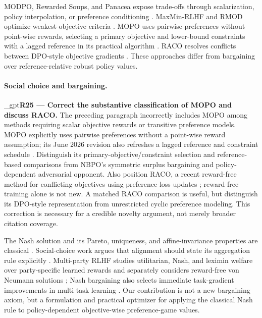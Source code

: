 \documentclass{article}
\newif\ifshowreviews
\newcommand{\reviewresponse}[1]{%
  \ifshowreviews
  \par\begingroup\color{blue!65!black}\hypersetup{allcolors=blue!65!black}\emergencystretch=2em%
  \noindent\textbf{Response:} #1\par\endgroup
  \fi}
\theoremstyle{remark}
\theoremstyle{plain}
\begin{document}
MODPO, Rewarded Soups, and Panacea expose trade-offs through scalarization, policy interpolation, or preference conditioning \citep{zhou2024beyond,rame2023rewarded,zhong2024panacea}. MaxMin-RLHF and RMOD optimize weakest-objective criteria \citep{chakraborty2024maxmin,son2026rmod}. MOPO uses pairwise preferences without point-wise rewards, selecting a primary objective and lower-bound constraints with a lagged reference in its practical algorithm \citep{agnihotri2026mopo}. RACO resolves conflicts between DPO-style objective gradients \citep{chen2026raco}. These approaches differ from bargaining over reference-relative robust policy values.

\paragraph{Social choice and bargaining.}

\kekim_gpt{\textbf{R25 --- Correct the substantive classification of MOPO and discuss RACO.} The preceding paragraph incorrectly includes MOPO among methods requiring scalar objective rewards or transitive preference models. MOPO explicitly uses pairwise preferences without a point-wise reward assumption; its June 2026 revision also refreshes a lagged reference and constraint schedule \citep{agnihotri2026mopo}. Distinguish its primary-objective/constraint selection and reference-based comparisons from NBPO's symmetric surplus bargaining and policy-dependent adversarial opponent. Also position RACO, a recent reward-free method for conflicting objectives using preference-loss updates \citep{chen2026raco}; reward-free training alone is not new. A matched RACO comparison is useful, but distinguish its DPO-style representation from unrestricted cyclic preference modeling. This correction is necessary for a credible novelty argument, not merely broader citation coverage.}
\reviewresponse{\textbf{R25 --- Addressed in positioning; empirical comparison remains limited.} MOPO is correctly described as pairwise and reward-free, with a primary objective and constraints; RACO's preference-loss gradients are included. The measured MOPO row drops the original robustification and is explicitly a plug-in adaptation, not a faithful reproduction. A matched RACO experiment is not reported.}

The Nash solution and its Pareto, uniqueness, and affine-invariance properties are classical \citep{nash1950}. Social-choice work argues that alignment should state its aggregation rule explicitly \citep{conitzer2024social}. Multi-party RLHF studies utilitarian, Nash, and leximin welfare over party-specific learned rewards and separately considers reward-free von Neumann solutions \citep{zhong2024nashwelfare}; Nash bargaining also selects immediate task-gradient improvements in multi-task learning \citep{navon2022nashmtl}. Our contribution is not a new bargaining axiom, but a formulation and practical optimizer for applying the classical Nash rule to policy-dependent objective-wise preference-game values.
\end{document}
